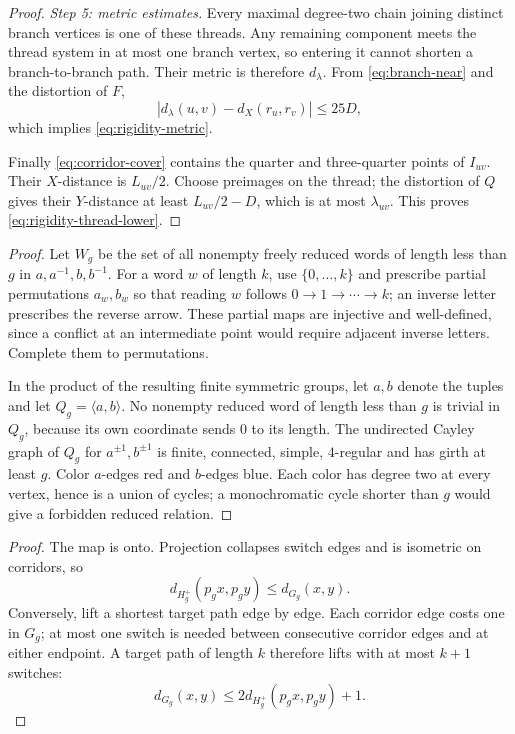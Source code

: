 \documentclass[11pt,a4paper]{article}
\theoremstyle{plain}
\theoremstyle{definition}
\theoremstyle{remark}
\newcommand{\Gg}{G_g}
\newcommand{\Hp}{H_g^{+}}
\begin{document}
\begin{proof}
\emph{Step 5: metric estimates.}
Every maximal degree-two chain joining distinct branch vertices is one of these threads. Any remaining component meets the thread system in at most one branch vertex, so entering it cannot shorten a branch-to-branch path. Their metric is therefore $d_\lambda$. From \eqref{eq:branch-near} and the distortion of $F$,
\[
 |d_\lambda(u,v)-d_X(r_u,r_v)|\le25D,
\]
which implies \eqref{eq:rigidity-metric}.

Finally \eqref{eq:corridor-cover} contains the quarter and three-quarter points of $I_{uv}$. Their $X$-distance is $L_{uv}/2$. Choose preimages on the thread; the distortion of $Q$ gives their $Y$-distance at least $L_{uv}/2-D$, which is at most $\lambda_{uv}$. This proves \eqref{eq:rigidity-thread-lower}.
\end{proof}

\label{pf:highgirth}
\lemhighgirth*
\begin{proof}
Let $W_g$ be the set of all nonempty freely reduced words of length less than $g$ in $a,a^{-1},b,b^{-1}$. For a word $w$ of length $k$, use $\{0,\ldots,k\}$ and prescribe partial permutations $a_w,b_w$ so that reading $w$ follows $0\to1\to\cdots\to k$; an inverse letter prescribes the reverse arrow. These partial maps are injective and well-defined, since a conflict at an intermediate point would require adjacent inverse letters. Complete them to permutations.

In the product of the resulting finite symmetric groups, let $a,b$ denote the tuples and let $Q_g=\langle a,b\rangle$. No nonempty reduced word of length less than $g$ is trivial in $Q_g$, because its own coordinate sends $0$ to its length. The undirected Cayley graph of $Q_g$ for $a^{\pm1},b^{\pm1}$ is finite, connected, simple, $4$-regular and has girth at least $g$. Color $a$-edges red and $b$-edges blue. Each color has degree two at every vertex, hence is a union of cycles; a monochromatic cycle shorter than $g$ would give a forbidden reduced relation.
\end{proof}

\label{pf:positive}
\lempositive*
\begin{proof}
The map is onto. Projection collapses switch edges and is isometric on corridors, so
\[
 d_{\Hp}(p_gx,p_gy)\le d_{\Gg}(x,y).
\]
Conversely, lift a shortest target path edge by edge. Each corridor edge costs one in $\Gg$; at most one switch is needed between consecutive corridor edges and at either endpoint. A target path of length $k$ therefore lifts with at most $k+1$ switches:
\[
 d_{\Gg}(x,y)\le2d_{\Hp}(p_gx,p_gy)+1.
\]
\end{proof}
\end{document}
